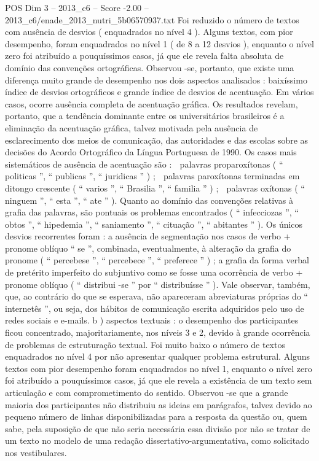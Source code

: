 \begin{textsample}{POS Dim 3 – 2013\_c6 – Score -2.00 – 2013\_c6/enade\_2013\_nutri\_5b06570937.txt}
Foi reduzido o número de textos com ausência de desvios ( enquadrados no nível 4 ).
Alguns textos, com pior desempenho, foram enquadrados no nível 1 ( de 8 a 12 desvios ), enquanto o nível zero foi atribuído a pouquíssimos casos, já que ele revela falta absoluta de domínio das convenções ortográficas.
Observou -se, portanto, que existe uma diferença muito grande de desempenho nos dois aspectos analisados : baixíssimo índice de desvios ortográficos e grande índice de desvios de acentuação.
Em vários casos, ocorre ausência completa de acentuação gráfica.
Os resultados revelam, portanto, que a tendência dominante entre os universitários brasileiros é a eliminação da acentuação gráfica, talvez motivada pela ausência de esclarecimento dos meios de comunicação, das autoridades e das escolas sobre as decisões do Acordo Ortográfico da Língua Portuguesa de 1990.
Os casos mais sistemáticos de ausência de acentuação são :  palavras proparoxítonas ( “ politicas ”, “ publicas ”, “ juridicas ” ) ;  palavras paroxítonas terminadas em ditongo crescente ( “ varios ”, “ Brasilia ”, “ familia ” ) ;  palavras oxítonas ( “ ninguem ”, “ esta ”, “ ate ” ).
Quanto ao domínio das convenções relativas à grafia das palavras, são pontuais os problemas encontrados ( “ infecciozas ”, “ obtos ”, “ hipedemia ”, “ saniamento ”, “ cituação ”, “ abitantes ” ).
Os únicos desvios recorrentes foram : a ausência de segmentação nos casos de verbo + pronome oblíquo “ se ”, combinada, eventualmente, à alteração da grafia do pronome ( “ percebese ”, “ percebece ”, “ preferece ” ) ; a grafia da forma verbal de pretérito imperfeito do subjuntivo como se fosse uma ocorrência de verbo + pronome oblíquo ( “ distribui -se ” por “ distribuísse ” ).
Vale observar, também, que, ao contrário do que se esperava, não apareceram abreviaturas próprias do “ internetês ”, ou seja, dos hábitos de comunicação escrita adquiridos pelo uso de redes sociais e e-mails. b ) aspectos textuais : o desempenho dos participantes ficou concentrado, majoritariamente, nos níveis 3 e 2, devido à grande ocorrência de problemas de estruturação textual.
Foi muito baixo o número de textos enquadrados no nível 4 por não apresentar qualquer problema estrutural.
Alguns textos com pior desempenho foram enquadrados no nível 1, enquanto o nível zero foi atribuído a pouquíssimos casos, já que ele revela a existência de um texto sem articulação e com comprometimento do sentido.
Observou -se que a grande maioria dos participantes não distribuiu as ideias em parágrafos, talvez devido ao pequeno número de linhas disponibilizadas para a resposta da questão ou, quem sabe, pela suposição de que não seria necessária essa divisão por não se tratar de um texto no modelo de uma redação dissertativo-argumentativa, como solicitado nos vestibulares.

\end{textsample}
